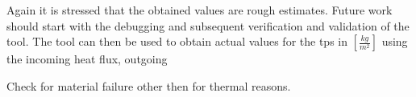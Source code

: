 Again it is stressed that the obtained values are rough estimates. Future work should start with the debugging and subsequent verification and validation of the tool. The tool can then be used to obtain actual values for the \gls{tps} in $\left[\frac{kg}{m^2}\right]$ using the incoming heat flux, outgoing


Check for material failure other then for thermal reasons.
